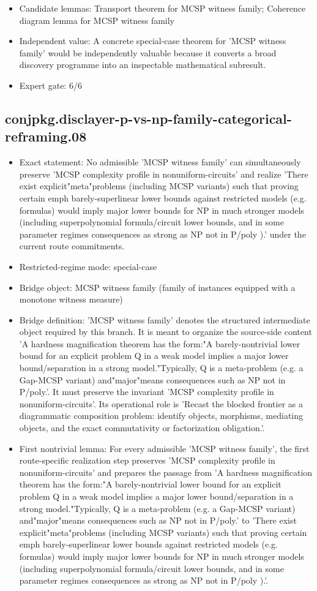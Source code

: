 \documentclass[11pt]{article}
\begin{document}
\begin{itemize}
\item Candidate lemmas: Transport theorem for MCSP witness family; Coherence diagram lemma for MCSP witness family
\item Independent value: A concrete special-case theorem for 'MCSP witness family' would be independently valuable because it converts a broad discovery programme into an inspectable mathematical subresult.
\item Expert gate: 6/6
\end{itemize}

\subsection*{conjpkg.disclayer-p-vs-np-family-categorical-reframing.08}
\begin{itemize}
\item Exact statement: No admissible 'MCSP witness family' can simultaneously preserve 'MCSP complexity profile in nonuniform-circuits' and realize 'There exist explicit"meta"problems (including MCSP variants) such that proving certain emph barely-superlinear lower bounds against restricted models (e.g. formulas) would imply major lower bounds for NP in much stronger models (including superpolynomial formula/circuit lower bounds, and in some parameter regimes consequences as strong as NP not in P/poly ).' under the current route commitments.
\item Restricted-regime mode: special-case
\item Bridge object: MCSP witness family (family of instances equipped with a monotone witness measure)
\item Bridge definition: 'MCSP witness family' denotes the structured intermediate object required by this branch. It is meant to organize the source-side content 'A hardness magnification theorem has the form:"A barely-nontrivial lower bound for an explicit problem Q in a weak model implies a major lower bound/separation in a strong model."Typically, Q is a meta-problem (e.g. a Gap-MCSP variant) and"major"means consequences such as NP not in P/poly.'. It must preserve the invariant 'MCSP complexity profile in nonuniform-circuits'. Its operational role is 'Recast the blocked frontier as a diagrammatic composition problem: identify objects, morphisms, mediating objects, and the exact commutativity or factorization obligation.'.
\item First nontrivial lemma: For every admissible 'MCSP witness family', the first route-specific realization step preserves 'MCSP complexity profile in nonuniform-circuits' and prepares the passage from 'A hardness magnification theorem has the form:"A barely-nontrivial lower bound for an explicit problem Q in a weak model implies a major lower bound/separation in a strong model."Typically, Q is a meta-problem (e.g. a Gap-MCSP variant) and"major"means consequences such as NP not in P/poly.' to 'There exist explicit"meta"problems (including MCSP variants) such that proving certain emph barely-superlinear lower bounds against restricted models (e.g. formulas) would imply major lower bounds for NP in much stronger models (including superpolynomial formula/circuit lower bounds, and in some parameter regimes consequences as strong as NP not in P/poly ).'.

\end{itemize}
\end{document}
